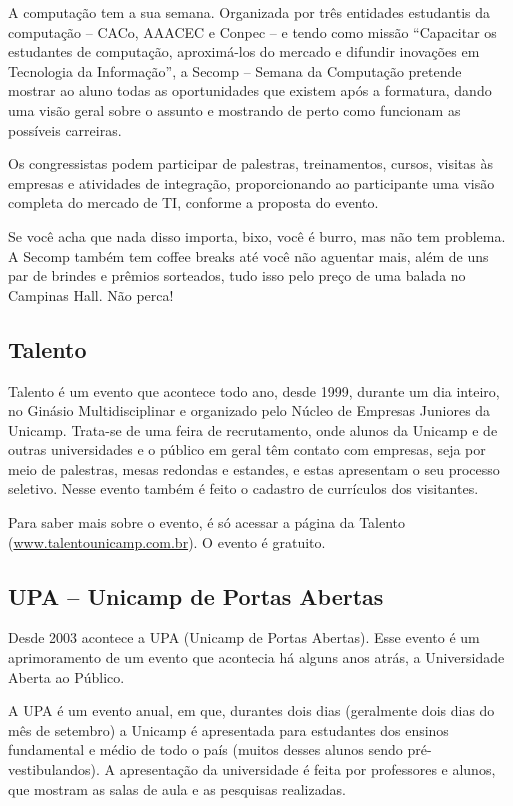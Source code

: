 A computação tem a sua semana. Organizada por três entidades estudantis da computação
-- CACo, AAACEC e Conpec -- e tendo como missão “Capacitar os estudantes de computação, aproximá-los do mercado e difundir inovações em 
Tecnologia da Informação”, a Secomp -- Semana da Computação pretende mostrar ao aluno 
todas as oportunidades que existem  após a formatura, dando uma visão geral sobre o 
assunto e mostrando de perto como funcionam as possíveis carreiras.

Os  congressistas podem participar de palestras, treinamentos, cursos, visitas às
empresas e atividades de integração, proporcionando ao participante uma visão completa 
do mercado de TI, conforme a proposta do evento.

Se você acha que nada disso importa, bixo, você é burro, mas não tem problema. A Secomp também tem
coffee breaks até você não aguentar mais, além de uns par de brindes e prêmios
sorteados, tudo isso pelo preço de uma balada no Campinas Hall. Não perca!

\subsection{Talento}

Talento é um evento que acontece todo ano, desde 1999, durante um dia inteiro,
no Ginásio Multidisciplinar e organizado pelo Núcleo de Empresas Juniores da
Unicamp. Trata-se de uma feira de recrutamento, onde alunos da Unicamp e de
outras universidades e o público em geral têm contato com empresas, seja por
meio de palestras, mesas redondas e estandes, e estas apresentam o seu processo
seletivo. Nesse evento também é feito o cadastro de currículos dos visitantes.

Para saber mais sobre o evento, é só acessar a página da Talento
(\url{www.talentounicamp.com.br}). O evento é gratuito.

\subsection{UPA -- Unicamp de Portas Abertas}

Desde 2003 acontece a UPA (Unicamp de Portas Abertas). Esse evento é um
aprimoramento de um evento que acontecia há alguns anos atrás, a Universidade
Aberta ao Público.

A UPA é um evento anual, em que, durantes dois dias (geralmente dois dias do mês
de setembro) a Unicamp é apresentada para estudantes dos ensinos fundamental
e médio de todo o país (muitos desses alunos sendo pré-vestibulandos). A apresentação
da universidade é feita por professores e alunos, que mostram as salas de aula
e as pesquisas realizadas.

